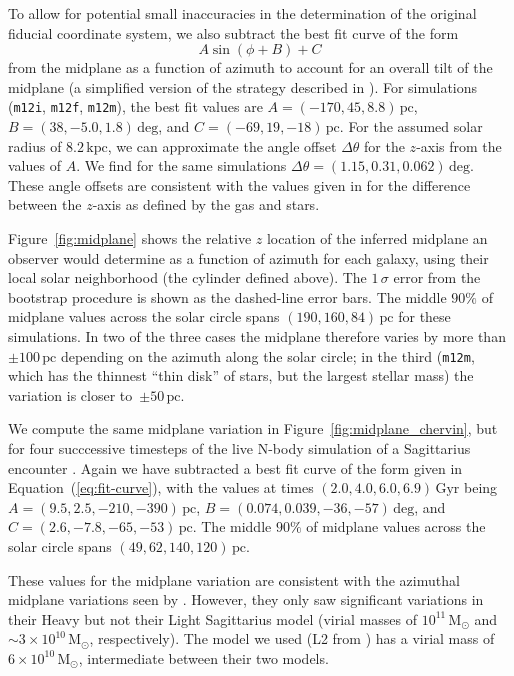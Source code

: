 \documentclass[twocolumn]{aastex62}
\newcommand{\Msun}{\ensuremath{\text{M}_\odot}}
\newcommand{\pc}{\text{pc}}
\newcommand{\kpc}{\text{kpc}}
\newcommand{\Gyr}{\text{Gyr}}
\newcommand{\mi}{\texttt{m12i}}
\newcommand{\mf}{\texttt{m12f}}
\newcommand{\mm}{\texttt{m12m}}
\newcommand{\beq}{\begin{equation}}
\newcommand{\eeq}{\end{equation}}
\begin{document}
To allow for potential small inaccuracies in the determination of the original
fiducial coordinate system, we also subtract the best fit curve of the form
\beq \label{eq:fit-curve}
A \sin{\left(\phi + B\right)} + C 
\eeq 
from the midplane as a function of azimuth to account for an overall tilt of
the midplane (a simplified version of the strategy described in
\citealt{2019ApJ...871..145A}). For simulations (\mi{}, \mf{}, \mm{}), the
best fit values are $A = (-170, 45, 8.8)\,\pc$, $B = (38, -5.0,
1.8)\,\text{deg}$, and $C = (-69, 19, -18)\,\pc$. For the assumed solar radius
of $8.2\,\kpc$, we can approximate the angle offset $\Delta \theta$ for the
$z$-axis from the values of $A$. We find for the same simulations $\Delta
\theta = (1.15, 0.31, 0.062)\,\text{deg}$. These angle offsets are consistent
with the values given in \citet{2018arXiv180610564S} for the difference
between the $z$-axis as defined by the gas and stars.

Figure~\ref{fig:midplane} shows the relative $z$ location of the inferred
midplane an observer would determine as a function of azimuth for each galaxy,
using their local solar neighborhood (the cylinder defined above). The
$1\,\sigma$ error from the bootstrap procedure is shown as the dashed-line
error bars. The middle $90\%$ of midplane values across the solar circle spans
$(190, 160, 84)\,\pc$ for these simulations. In two of the three cases the
midplane therefore varies by more than $\pm 100\,\pc$ depending on the azimuth
along the solar circle; in the third (\mm{}, which has the thinnest ``thin
disk'' of stars, but the largest stellar mass) the variation is closer to~$\pm
50\,\pc$.

We compute the same midplane variation in Figure~\ref{fig:midplane_chervin},
but for four succcessive timesteps of the live N-body simulation of a
Sagittarius encounter \citep{2018MNRAS.481..286L}. Again we have subtracted a
best fit curve of the form given in Equation~(\ref{eq:fit-curve}), with the
values at times $(2.0, 4.0, 6.0, 6.9)\,\Gyr$ being $A = (9.5, 2.5, -210,
-390)\,\pc$, $B = (0.074, 0.039, -36, -57)\,\text{deg}$, and $C = (2.6,-7.8,
-65, -53)\,\pc$. The middle $90\%$ of midplane values across the solar circle
spans $(49, 62, 140, 120)\,\pc$.

These values for the midplane variation are consistent with the azimuthal
midplane variations seen by \citet{2013MNRAS.429..159G}. However, they only
saw significant variations in their Heavy but not their Light Sagittarius
model (virial masses of $10^{11}\,\Msun$ and $\sim3\times10^{10}\,\Msun$,
respectively). The model we used (L2 from \citet{2018MNRAS.481..286L}) has a
virial mass of $6\times10^{10}\,\Msun$, intermediate between their two models.
\end{document}

